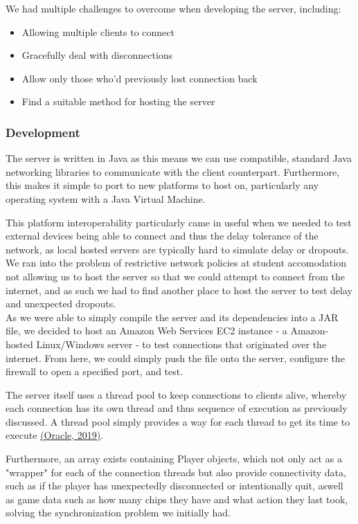 \documentclass[11pt]{article}
\begin{document}
We had multiple challenges to overcome when developing the server, including:

\begin{itemize}
	\item Allowing multiple clients to connect
	\item Gracefully deal with disconnections
	\item Allow only those who'd previously lost connection back
	\item Find a suitable method for hosting the server
\end{itemize}


\subsubsection{Development}
The server is written in Java as this means we can use compatible, standard Java networking libraries to communicate with the client counterpart. Furthermore, this makes it simple to port to new platforms to host on, particularly any operating system with a Java Virtual Machine.

This platform interoperability particularly came in useful when we needed to test external devices being able to connect and thus the delay tolerance of the network, as local hosted servers are typically hard to simulate delay or dropouts. We ran into the problem of restrictive network policies at student accomodation not allowing us to host the server so that we could attempt to connect from the internet, and as such we had to find another place to host the server to test delay and unexpected dropouts. \\

As we were able to simply compile the server and its dependencies into a JAR file, we decided to host an Amazon Web Services EC2 instance - a Amazon-hosted Linux/Windows server - to test connections that originated over the internet. From here, we could simply push the file onto the server, configure the firewall to open a specified port, and test. 

The server itself uses a thread pool to keep connections to clients alive, whereby each connection has its own thread and thus sequence of execution as previously discussed. A thread pool simply provides a way for each thread to get its time to execute  \hyperlink{threadpool}{(Oracle, 2019)}. 

Furthermore, an array exists containing Player objects, which not only act as a "wrapper" for each of the connection threads but also provide connectivity data, such as if the player has unexpectedly disconnected or intentionally quit, aswell as game data such as how many chips they have and what action they last took, solving the synchronization problem we initially had. 
\end{document}
